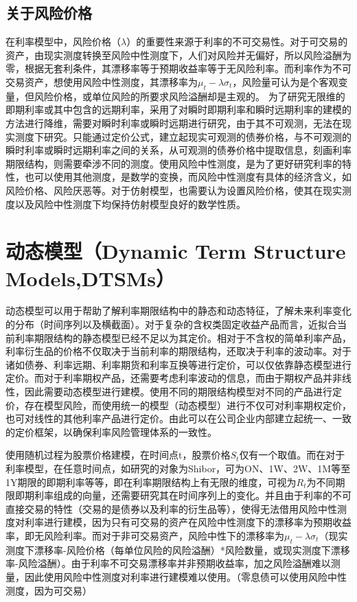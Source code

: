 \documentclass[11pt]{article}
\begin{document}
\subsection{关于风险价格}

在利率模型中，风险价格（$\lambda$）的重要性来源于利率的不可交易性。对于可交易的资产，由现实测度转换至风险中性测度下，人们对风险并无偏好，所以风险溢酬为零，根据无套利条件，其漂移率等于预期收益率等于无风险利率。而利率作为不可交易资产，想使用风险中性测度，其漂移率为$\mu_t-\lambda\sigma_t$，风险量可认为是个客观变量，但风险价格，或单位风险的所要求风险溢酬却是主观的。
为了研究无限维的即期利率或其中包含的远期利率，采用了对瞬时即期利率和瞬时远期利率的建模的方法进行降维，需要对瞬时利率或瞬时远期进行研究，由于其不可观测，无法在现实测度下研究。只能通过定价公式，建立起现实可观测的债券价格，与不可观测的瞬时利率或瞬时远期利率之间的关系，从可观测的债券价格中提取信息，刻画利率期限结构，则需要牵涉不同的测度。使用风险中性测度，是为了更好研究利率的特性，也可以使用其他测度，是数学的变换，而风险中性测度有具体的经济含义，如风险价格、风险厌恶等。对于仿射模型，也需要认为设置风险价格，使其在现实测度以及风险中性测度下均保持仿射模型良好的数学性质。

\section{动态模型（Dynamic Term Structure Models,DTSMs）}

动态模型可以用于帮助了解利率期限结构中的静态和动态特征，了解未来利率变化的分布（时间序列以及横截面）。对于复杂的含权类固定收益产品而言，近拟合当前利率期限结构的静态模型已经不足以为其定价。相对于不含权的简单利率产品，利率衍生品的价格不仅取决于当前利率的期限结构，还取决于利率的波动率。对于诸如债券、利率远期、利率期货和利率互换等进行定价，可以仅依靠静态模型进行定价。而对于利率期权产品，还需要考虑利率波动的信息，而由于期权产品并非线性，因此需要动态模型进行建模。使用不同的期限结构模型对不同的产品进行定价，存在模型风险，而使用统一的模型（动态模型）进行不仅可对利率期权定价，也可对线性的其他利率产品进行定价。由此可以在公司企业内部建立起统一、一致的定价框架，以确保利率风险管理体系的一致性。

使用随机过程为股票价格建模，在时间点t，股票价格$S_t$仅有一个取值。而在对于利率模型，在任意时间点，如研究的对象为Shibor，可为ON、1W、2W、1M等至1Y期限的即期利率等等，即在利率期限结构上有无限的维度，可视为$R_t$为不同期限即期利率组成的向量，还需要研究其在时间序列上的变化。并且由于利率的不可直接交易的特性（交易的是债券以及利率的衍生品等），使得无法借用风险中性测度对利率进行建模，因为只有可交易的资产在风险中性测度下的漂移率为预期收益率，即无风险利率。而对于非可交易资产，风险中性下的漂移率为$\mu_t-\lambda\sigma_t$（现实测度下漂移率-风险价格（每单位风险的风险溢酬）*风险数量，或现实测度下漂移率-风险溢酬）。由于利率不可交易漂移率并非预期收益率，加之风险溢酬难以测量，因此使用风险中性测度对利率进行建模难以使用。（零息债可以使用风险中性测度，因为可交易）
\end{document}
